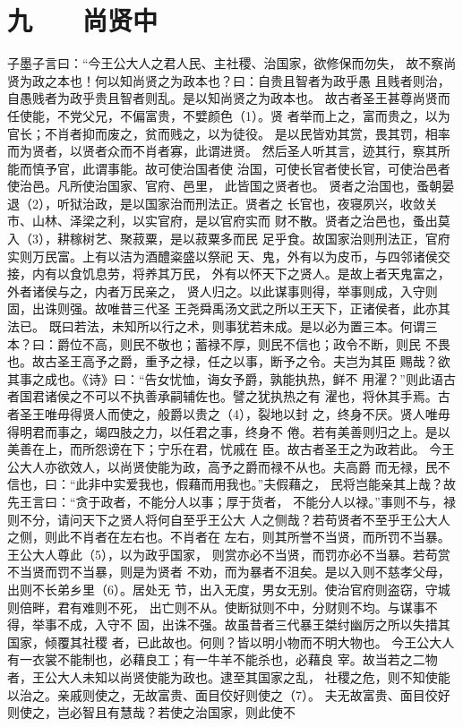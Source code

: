 \documentclass[12pt,UTF8]{ctexbook}
\begin{document}
\chapter{九　　尚贤中  }

子墨子言曰：“今王公大人之君人民、主社稷、治国家，欲修保而勿失， 
故不察尚贤为政之本也！何以知尚贤之为政本也？曰：自贵且智者为政乎愚 
且贱者则治，自愚贱者为政乎贵且智者则乱。是以知尚贤之为政本也。 
故古者圣王甚尊尚贤而任使能，不党父兄，不偏富贵，不嬖颜色（1）。贤 
者举而上之，富而贵之，以为官长；不肖者抑而废之，贫而贱之，以为徒役。 
是以民皆劝其赏，畏其罚，相率而为贤者，以贤者众而不肖者寡，此谓进贤。 
然后圣人听其言，迹其行，察其所能而慎予官，此谓事能。故可使治国者使 
治国，可使长官者使长官，可使治邑者使治邑。凡所使治国家、官府、邑里， 
此皆国之贤者也。 
贤者之治国也，蚤朝晏退（2），听狱治政，是以国家治而刑法正。贤者之 
长官也，夜寝夙兴，收敛关市、山林、泽梁之利，以实官府，是以官府实而 
财不散。贤者之治邑也，蚤出莫入（3），耕稼树艺、聚菽粟，是以菽粟多而民 
足乎食。故国家治则刑法正，官府实则万民富。上有以洁为酒醴粢盛以祭祀 
天、鬼，外有以为皮币，与四邻诸侯交接，内有以食饥息劳，将养其万民， 
外有以怀天下之贤人。是故上者天鬼富之，外者诸侯与之，内者万民亲之， 
贤人归之。以此谋事则得，举事则成，入守则固，出诛则强。故唯昔三代圣 
王尧舜禹汤文武之所以王天下，正诸侯者，此亦其法已。 
既曰若法，未知所以行之术，则事犹若未成。是以必为置三本。何谓三 
本？曰：爵位不高，则民不敬也；蓄禄不厚，则民不信也；政令不断，则民 
不畏也。故古圣王高予之爵，重予之禄，任之以事，断予之令。夫岂为其臣 
赐哉？欲其事之成也。《诗》曰：“告女忧恤，诲女予爵，孰能执热，鲜不 
用濯？”则此语古者国君诸侯之不可以不执善承嗣辅佐也。譬之犹执热之有 
濯也，将休其手焉。古者圣王唯毋得贤人而使之，般爵以贵之（4），裂地以封 
之，终身不厌。贤人唯毋得明君而事之，竭四肢之力，以任君之事，终身不 
倦。若有美善则归之上。是以美善在上，而所怨谤在下；宁乐在君，忧戚在 
臣。故古者圣王之为政若此。 
今王公大人亦欲效人，以尚贤使能为政，高予之爵而禄不从也。夫高爵 
而无禄，民不信也，曰：“此非中实爱我也，假藉而用我也。”夫假藉之， 
民将岂能亲其上哉？故先王言曰：“贪于政者，不能分人以事；厚于货者， 
不能分人以禄。”事则不与，禄则不分，请问天下之贤人将何自至乎王公大 
人之侧哉？若苟贤者不至乎王公大人之侧，则此不肖者在左右也。不肖者在 
左右，则其所誉不当贤，而所罚不当暴。王公大人尊此（5），以为政乎国家， 
则赏亦必不当贤，而罚亦必不当暴。若苟赏不当贤而罚不当暴，则是为贤者 
不劝，而为暴者不沮矣。是以入则不慈孝父母，出则不长弟乡里（6）。居处无 
节，出入无度，男女无别。使治官府则盗窃，守城则倍畔，君有难则不死， 
出亡则不从。使断狱则不中，分财则不均。与谋事不得，举事不成，入守不 
固，出诛不强。故虽昔者三代暴王桀纣幽厉之所以失措其国家，倾覆其社稷 
者，已此故也。何则？皆以明小物而不明大物也。 
今王公大人有一衣裳不能制也，必藉良工；有一牛羊不能杀也，必藉良 
宰。故当若之二物者，王公大人未知以尚贤使能为政也。逮至其国家之乱， 
社稷之危，则不知使能以治之。亲戚则使之，无故富贵、面目佼好则使之（7）。 
夫无故富贵、面目佼好则使之，岂必智且有慧哉？若使之治国家，则此使不 
\end{document}
